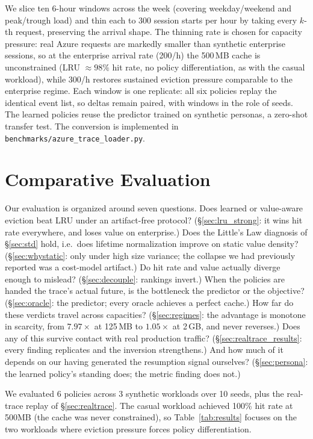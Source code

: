 \documentclass[letterpaper,twocolumn,10pt]{article}
\begin{document}
We slice ten 6-hour windows across the week (covering weekday/weekend and peak/trough load) and thin each to 300 session starts per hour by taking every $k$-th request, preserving the arrival shape. The thinning rate is chosen for capacity pressure: real Azure requests are markedly smaller than synthetic enterprise sessions, so at the enterprise arrival rate (200/h) the 500\,MB cache is unconstrained (LRU ${\approx}98\%$ hit rate, no policy differentiation, as with the casual workload), while 300/h restores sustained eviction pressure comparable to the enterprise regime. Each window is one replicate: all six policies replay the identical event list, so deltas remain paired, with windows in the role of seeds. The learned policies reuse the predictor trained on synthetic personas, a zero-shot transfer test. The conversion is implemented in \texttt{benchmarks/azure\_trace\_loader.py}.

\section{Comparative Evaluation}
\label{sec:eval}

Our evaluation is organized around seven questions. Does learned or value-aware eviction beat LRU under an artifact-free protocol? (\S\ref{sec:lru_strong}: it wins hit rate everywhere, and loses value on enterprise.) Does the Little's Law diagnosis of \S\ref{sec:std} hold, i.e.\ does lifetime normalization improve on static value density? (\S\ref{sec:whystatic}: only under high size variance; the collapse we had previously reported was a cost-model artifact.) Do hit rate and value actually diverge enough to mislead? (\S\ref{sec:decouple}: rankings invert.) When the policies are handed the trace's actual future, is the bottleneck the predictor or the objective? (\S\ref{sec:oracle}: the predictor; every oracle achieves a perfect cache.) How far do these verdicts travel across capacities? (\S\ref{sec:regimes}: the advantage is monotone in scarcity, from $7.97\times$ at 125\,MB to $1.05\times$ at 2\,GB, and never reverses.) Does any of this survive contact with real production traffic? (\S\ref{sec:realtrace_results}: every finding replicates and the inversion strengthens.) And how much of it depends on our having generated the resumption signal ourselves? (\S\ref{sec:persona}: the learned policy's standing does; the metric finding does not.)

We evaluated 6 policies across 3 synthetic workloads over 10 seeds, plus the real-trace replay of \S\ref{sec:realtrace}. The casual workload achieved 100\% hit rate at 500MB (the cache was never constrained), so Table~\ref{tab:results} focuses on the two workloads where eviction pressure forces policy differentiation.
\end{document}
